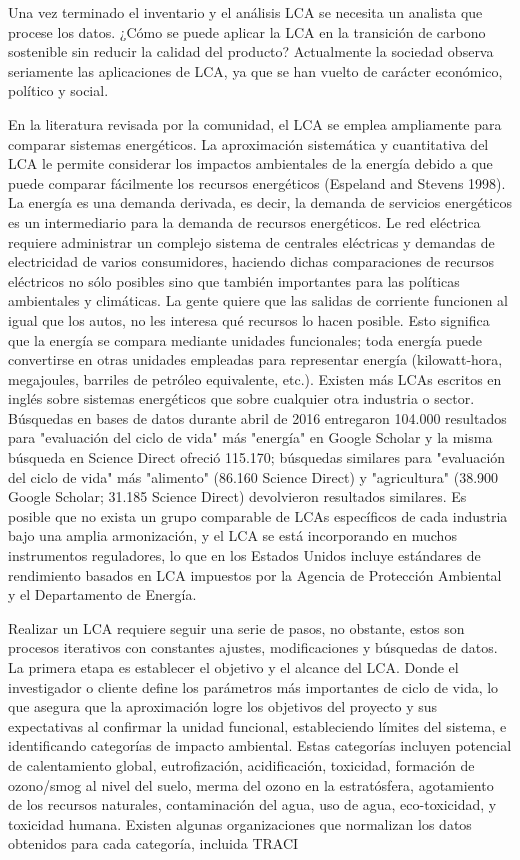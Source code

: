 \documentclass[runningheads]{llncs}
\begin{document}
\bigskip
Una vez terminado el inventario y el análisis LCA se necesita un analista que procese los datos. ¿Cómo se puede aplicar la LCA en la transición de carbono sostenible sin reducir la calidad del producto? Actualmente la sociedad observa seriamente las aplicaciones de LCA, ya que se han vuelto de carácter económico, político y social.

\bigskip
En la literatura revisada por la comunidad, el LCA se emplea ampliamente para comparar sistemas energéticos. La aproximación sistemática y cuantitativa del LCA le permite considerar los impactos ambientales de la energía debido a que puede comparar fácilmente los recursos energéticos (Espeland and Stevens 1998). La energía es una demanda derivada, es decir, la demanda de servicios energéticos es un intermediario para la demanda de recursos energéticos. Le red eléctrica requiere administrar un complejo sistema de centrales eléctricas y demandas de electricidad de varios consumidores, haciendo dichas comparaciones de recursos eléctricos no sólo posibles sino que también importantes para las políticas ambientales y climáticas. La gente quiere que las salidas de corriente funcionen al igual que los autos, no les interesa qué recursos lo hacen posible. Esto significa que la energía se compara mediante unidades funcionales; toda energía puede convertirse en otras unidades empleadas para representar energía (kilowatt-hora, megajoules, barriles de petróleo equivalente, etc.). Existen más LCAs escritos en inglés sobre sistemas energéticos que sobre cualquier otra industria o sector. Búsquedas en bases de datos durante abril de 2016 entregaron 104.000 resultados para "evaluación del ciclo de vida" más "energía" en Google Scholar y la misma búsqueda en Science Direct ofreció 115.170; búsquedas similares para "evaluación del ciclo de vida" más "alimento" (86.160 Science Direct) y "agricultura" (38.900 Google Scholar; 31.185 Science Direct) devolvieron resultados similares. Es posible que no exista un grupo comparable de LCAs específicos de cada industria bajo una amplia armonización, y el LCA se está incorporando en muchos instrumentos reguladores, lo que en los Estados Unidos incluye estándares de rendimiento basados en LCA impuestos por la Agencia de Protección Ambiental y el Departamento de Energía.

\bigskip
Realizar un LCA requiere seguir una serie de pasos, no obstante, estos son procesos iterativos con constantes ajustes, modificaciones y búsquedas de datos. La primera etapa es establecer el objetivo y el alcance del LCA. Donde el investigador o cliente define los parámetros más importantes de ciclo de vida, lo que asegura que la aproximación logre los objetivos del proyecto y sus expectativas al confirmar la unidad funcional, estableciendo límites del sistema, e identificando categorías de impacto ambiental. Estas categorías incluyen potencial de calentamiento global, eutrofización, acidificación, toxicidad, formación de ozono/smog al nivel del suelo, merma del ozono en la estratósfera, agotamiento de los recursos naturales, contaminación del agua, uso de agua, eco-toxicidad, y toxicidad humana. Existen algunas organizaciones que normalizan los datos obtenidos para cada categoría, incluida TRACI
\end{document}
